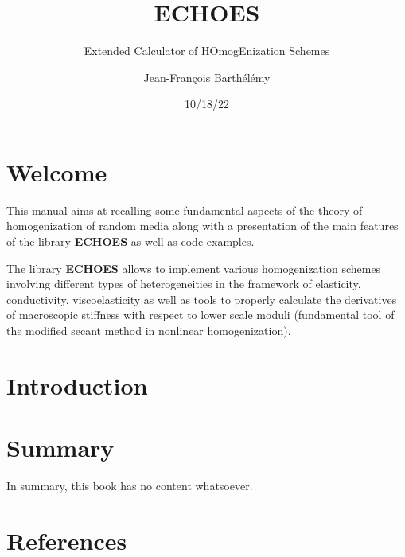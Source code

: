\documentclass[
  letterpaper,
  DIV=11,
  numbers=noendperiod]{scrreprt}
\title{ECHOES}
\subtitle{Extended Calculator of HOmogEnization Schemes}
\author{Jean-François Barthélémy}
\date{10/18/22}
\renewcommand*\contentsname{Table of contents}
\newcommand\contentsname{Table of contents}
\begin{document}
\maketitle
\renewcommand*\contentsname{Table of contents}
{
\hypersetup{linkcolor=}
\setcounter{tocdepth}{2}
\tableofcontents
}

\hypertarget{welcome}{%
\chapter*{Welcome}\label{welcome}}


This manual aims at recalling some fundamental aspects of the theory of
homogenization of random media along with a presentation of the main
features of the library \textbf{ECHOES} as well as code examples.

The library \textbf{ECHOES} allows to implement various homogenization
schemes involving different types of heterogeneities in the framework of
elasticity, conductivity, viscoelasticity as well as tools to properly
calculate the derivatives of macroscopic stiffness with respect to lower
scale moduli (fundamental tool of the modified secant method in
nonlinear homogenization).


\hypertarget{introduction}{%
\chapter{Introduction}\label{introduction}}


\hypertarget{summary}{%
\chapter{Summary}\label{summary}}

In summary, this book has no content whatsoever.


\hypertarget{references}{%
\chapter*{References}\label{references}}

\end{document}
